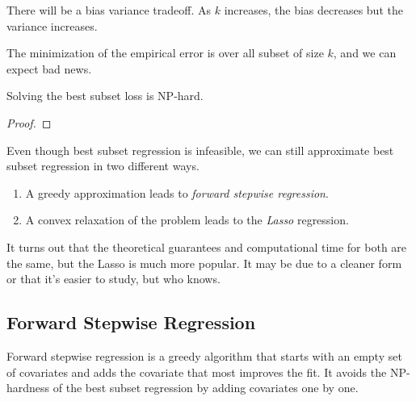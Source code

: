   There will be a bias variance tradeoff. As $k$ increases, the bias decreases but the variance increases. 

  The minimization of the empirical error is over all subset of size $k$, and we can expect bad news. 

  \begin{theorem}
    Solving the best subset loss is NP-hard. 
  \end{theorem}
  \begin{proof}
    
  \end{proof}

  Even though best subset regression is infeasible, we can still approximate best subset regression in two different ways. 
  \begin{enumerate}
    \item A greedy approximation leads to \textit{forward stepwise regression}. 
    \item A convex relaxation of the problem leads to the \textit{Lasso} regression. 
  \end{enumerate}
  It turns out that the theoretical guarantees and computational time for both are the same, but the Lasso is much more popular. It may be due to a cleaner form or that it's easier to study, but who knows. 

\subsection{Forward Stepwise Regression} 

  Forward stepwise regression is a greedy algorithm that starts with an empty set of covariates and adds the covariate that most improves the fit. It avoids the NP-hardness of the best subset regression by adding covariates one by one. 

